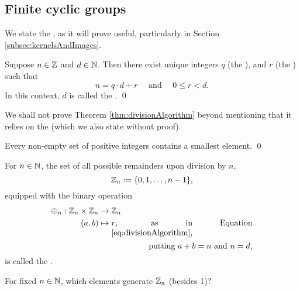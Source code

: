 \documentclass[../algebraNotesMSRI-UP2016.tex]{subfiles}
\begin{document}
\subsection[\subsecname]{Finite cyclic groups}
\begin{frame}[c]{\subsecname}{}
We state the , as it will prove useful, particularly in Section \ref{subsec:kernelsAndImages}.

\smallGap
\begin{thm}\label{thm:divisionAlgorithm}
Suppose $n\in\mathbb Z$ and $d\in\mathbb N$.  Then there exist unique integers $q$ (the ), and $r$ (the ) such that 
\begin{equation}\label{eq:divisionAlgorithm}
n = q\cdot d+r \quad\text{ and }\quad 0 \leq r < d.
\end{equation}
In this context, $d$ is called the .
\qed
\end{thm}
\end{frame}

\begin{frame}[c]
We shall not prove Theorem \ref{thm:divisionAlgorithm} beyond mentioning that it relies on the  (which we also state without proof).  

\smallGap
\begin{thm}
Every non-empty set of positive integers contains a smallest element. 
\qed
\end{thm}
\end{frame}

\begin{frame}
%
\begin{dfn}\label{dfn:ZmodnZ}
For $n\in\mathbb N$, the set of all possible remainders upon division by $n$,
\[
\mathbb Z_n:=\{0,1,\dots,n-1\},
\]
equipped with the binary operation
\begin{align*}
\oplus_n:\Z_n\times \Z_n &\to \Z_n \\
	(a,b) &\mapsto \parbox[t]{0.5\textwidth}{
		$r$, as in Equation \eqref{eq:divisionAlgorithm}, 
		\vspace{-0.3pc}
		\flushright putting $a+b=n$ and $n=d$,}
\end{align*}
is called the .
\end{dfn}

\smallGap
\begin{que}[cf. Problem 57]
For fixed $n\in\mathbb N$, which elements generate $\mathbb Z_n$ (besides 1)?
\end{que}
\end{frame}
\end{document}
